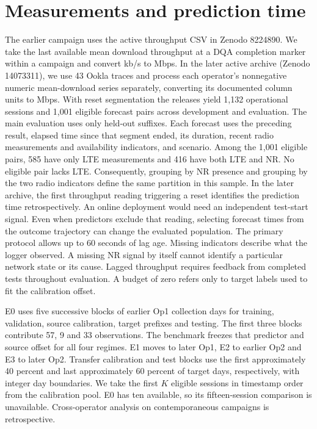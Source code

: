 \documentclass[journal,onecolumn,10pt]{IEEEtran}
\begin{document}
\section{Measurements and prediction time}
The earlier campaign uses the active throughput CSV in Zenodo 8224890. We take the last available mean download throughput at a DQA completion marker within a campaign and convert kb/s to Mbps. In the later active archive (Zenodo 14073311), we use 43 Ookla traces and process each operator's nonnegative numeric mean-download series separately, converting its documented column units to Mbps. With reset segmentation the releases yield 1,132 operational sessions and 1,001 eligible forecast pairs across development and evaluation. The main evaluation uses only held-out suffixes.
Each forecast uses the preceding result, elapsed time since that segment ended, its duration, recent radio measurements and availability indicators, and scenario. Among the 1,001 eligible pairs, 585 have only LTE measurements and 416 have both LTE and NR. No eligible pair lacks LTE. Consequently, grouping by NR presence and grouping by the two radio indicators define the same partition in this sample. In the later archive, the first throughput reading triggering a reset identifies the prediction time retrospectively. An online deployment would need an independent test-start signal. Even when predictors exclude that reading, selecting forecast times from the outcome trajectory can change the evaluated population. The primary protocol allows up to 60 seconds of lag age. Missing indicators describe what the logger observed. A missing NR signal by itself cannot identify a particular network state or its cause. Lagged throughput requires feedback from completed tests throughout evaluation. A budget of zero refers only to target labels used to fit the calibration offset.

E0 uses five successive blocks of earlier Op1 collection days for training, validation, source calibration, target prefixes and testing. The first three blocks contribute 57, 9 and 33 observations. The benchmark freezes that predictor and source offset for all four regimes. E1 moves to later Op1, E2 to earlier Op2 and E3 to later Op2. Transfer calibration and test blocks use the first approximately 40 percent and last approximately 60 percent of target days, respectively, with integer day boundaries. We take the first $K$ eligible sessions in timestamp order from the calibration pool. E0 has ten available, so its fifteen-session comparison is unavailable. Cross-operator analysis on contemporaneous campaigns is retrospective.
\end{document}
